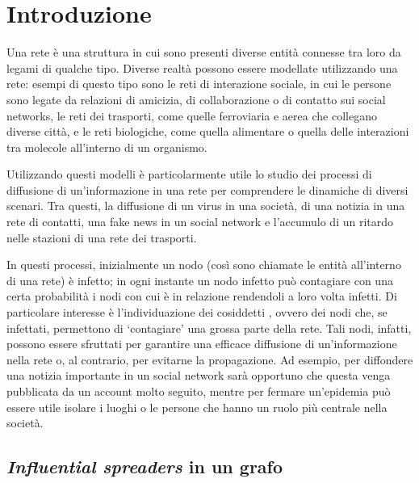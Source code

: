\chapter{Introduzione}

Una rete è una struttura in cui sono presenti diverse entità connesse tra loro da legami 
di qualche tipo. Diverse realtà possono essere modellate utilizzando una rete:
esempi di questo tipo sono le reti di interazione sociale, in cui le persone sono legate 
da relazioni di amicizia, di collaborazione o di contatto sui social networks, 
le reti dei trasporti, come quelle ferroviaria e aerea
che collegano diverse città, e le reti biologiche, come quella alimentare o
quella delle interazioni tra molecole all'interno di un organismo.

Utilizzando questi modelli è particolarmente utile lo studio dei processi di diffusione
di un'informazione in una rete per comprendere le dinamiche di diversi scenari.
Tra questi, la diffusione di un virus in una società, di una notizia in una rete di contatti, 
una fake news in un social network e l'accumulo di un ritardo nelle stazioni di una rete 
dei trasporti.

In questi processi, inizialmente un nodo (così sono chiamate le entità all'interno di una rete) 
è infetto; in ogni instante un nodo infetto può contagiare con una certa probabilità i 
nodi con cui è in relazione rendendoli a loro volta infetti.
Di particolare interesse è l'individuazione dei cosiddetti \infsp, ovvero dei nodi
che, se infettati, permettono di `contagiare' una grossa parte della rete.
Tali nodi, infatti, possono essere sfruttati per garantire una efficace diffusione 
di un'informazione nella rete o, al contrario, per evitarne la propagazione.
Ad esempio, per diffondere una notizia importante in un social network sarà opportuno che 
questa venga pubblicata da un account molto seguito, mentre per fermare un'epidemia 
può essere utile isolare i luoghi o le persone che hanno un ruolo più centrale
nella società.


\section{\textit{Influential spreaders} in un grafo}

